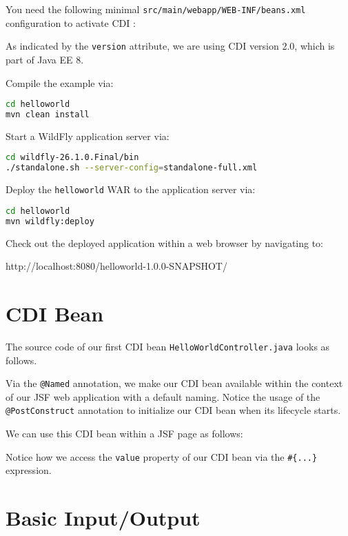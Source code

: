 You need the following minimal \texttt{src/main/webapp/WEB-INF/beans.xml} configuration to activate CDI \cite{CDI2}:

As indicated by the \texttt{version} attribute, we are using CDI version 2.0, which is part of Java EE 8.

Compile the example via:
\begin{lstlisting}[language=bash]
cd helloworld
mvn clean install
\end{lstlisting}

Start a WildFly \cite{WildFly} application server via:
\begin{lstlisting}[language=bash]
cd wildfly-26.1.0.Final/bin
./standalone.sh --server-config=standalone-full.xml
\end{lstlisting}

Deploy the \texttt{helloworld} WAR to the application server via:
\begin{lstlisting}[language=bash]
cd helloworld
mvn wildfly:deploy
\end{lstlisting}

Check out the deployed application within a web browser by navigating to:

http://localhost:8080/helloworld-1.0.0-SNAPSHOT/

\section{CDI Bean}

The source code of our first CDI \cite{CDI2} bean \texttt{HelloWorldController.java} looks as follows.

Via the \texttt{@Named} annotation, we make our CDI bean available within the context of our JSF web application with a default naming.
Notice the usage of the \texttt{@PostConstruct} annotation to initialize our CDI bean when its lifecycle starts.

We can use this CDI bean within a JSF page as follows:

Notice how we access the \texttt{value} property of our CDI bean via the \texttt{\#\{...\}} expression.

\section{Basic Input/Output}
\label{sec:basic-input-output}

